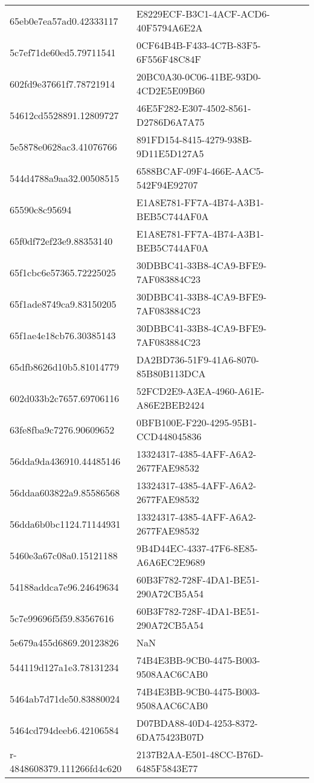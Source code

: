 \begin{tabular}{ll}
65eb0e7ea57ad0.42333117 & E8229ECF-B3C1-4ACF-ACD6-40F5794A6E2A \\
5c7ef71de60ed5.79711541 & 0CF64B4B-F433-4C7B-83F5-6F556F48C84F \\
602fd9e37661f7.78721914 & 20BC0A30-0C06-41BE-93D0-4CD2E5E09B60 \\
54612cd5528891.12809727 & 46E5F282-E307-4502-8561-D2786D6A7A75 \\
5e5878e0628ac3.41076766 & 891FD154-8415-4279-938B-9D11E5D127A5 \\
544d4788a9aa32.00508515 & 6588BCAF-09F4-466E-AAC5-542F94E92707 \\
65590c8c95694 & E1A8E781-FF7A-4B74-A3B1-BEB5C744AF0A \\
65f0df72ef23e9.88353140 & E1A8E781-FF7A-4B74-A3B1-BEB5C744AF0A \\
65f1cbc6e57365.72225025 & 30DBBC41-33B8-4CA9-BFE9-7AF083884C23 \\
65f1ade8749ca9.83150205 & 30DBBC41-33B8-4CA9-BFE9-7AF083884C23 \\
65f1ae4e18cb76.30385143 & 30DBBC41-33B8-4CA9-BFE9-7AF083884C23 \\
65dfb8626d10b5.81014779 & DA2BD736-51F9-41A6-8070-85B80B113DCA \\
602d033b2c7657.69706116 & 52FCD2E9-A3EA-4960-A61E-A86E2BEB2424 \\
63fe8fba9c7276.90609652 & 0BFB100E-F220-4295-95B1-CCD448045836 \\
56dda9da436910.44485146 & 13324317-4385-4AFF-A6A2-2677FAE98532 \\
56ddaa603822a9.85586568 & 13324317-4385-4AFF-A6A2-2677FAE98532 \\
56dda6b0bc1124.71144931 & 13324317-4385-4AFF-A6A2-2677FAE98532 \\
5460e3a67c08a0.15121188 & 9B4D44EC-4337-47F6-8E85-A6A6EC2E9689 \\
54188addca7e96.24649634 & 60B3F782-728F-4DA1-BE51-290A72CB5A54 \\
5c7e99696f5f59.83567616 & 60B3F782-728F-4DA1-BE51-290A72CB5A54 \\
5e679a455d6869.20123826 & NaN \\
544119d127a1e3.78131234 & 74B4E3BB-9CB0-4475-B003-9508AAC6CAB0 \\
5464ab7d71de50.83880024 & 74B4E3BB-9CB0-4475-B003-9508AAC6CAB0 \\
5464cd794deeb6.42106584 & D07BDA88-40D4-4253-8372-6DA75423B07D \\
r-4848608379.111266fd4c620 & 2137B2AA-E501-48CC-B76D-6485F5843E77 \\

\end{tabular}
